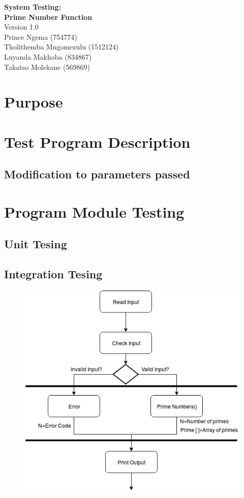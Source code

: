\documentclass[11 pt]{article}
\begin{document}
  
  \begin{titlepage}
\begin{center}
\huge{\bfseries{System Testing:}}\\
[2mm]
\huge{\bfseries{Prime Number Function}}\\
Version 1.0\\
  \vskip 0.2in
 Prince Ngema (754774)\\
 Tholithemba Mngomezulu (1512124)\\
 Luyanda Makhoba (834867) \\
 Takatso Molekane (569869)\\
 
 

\end{center}
 \end{titlepage}
 \tableofcontents
 \newpage
 \section{Purpose}
\section{Test Program Description}
\subsection{Modification to parameters passed}
\section{Program Module Testing}
\subsection{Unit Tesing}
\subsection{Integration Tesing}
 \begin{figure}[h]
    \centering
    
    \includegraphics[width=\linewidth]{Integration Testing.png}
    \end{figure}
\end{document}
